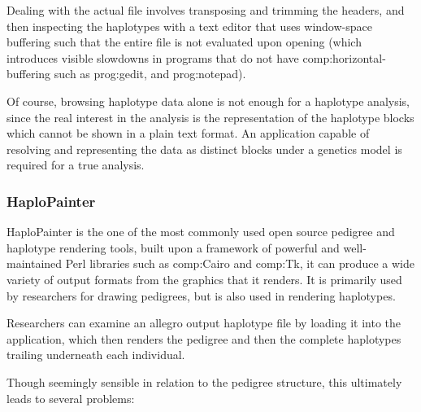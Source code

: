 Dealing with the actual file involves transposing and trimming the headers, and then inspecting the haplotypes with a text editor that uses window-space buffering such that the entire file is not evaluated upon opening (which introduces visible slowdowns in programs that do not have \gls{comp:horizontal-buffering} such as \gls{prog:gedit}, and \gls{prog:notepad}).

Of course, browsing haplotype data alone is not enough for a haplotype analysis, since the real interest in the analysis is the representation of the haplotype blocks which cannot be shown in a plain text format. An application capable of resolving and representing the data as distinct blocks under a genetics model is required for a true analysis.


\subsubsection{HaploPainter}

HaploPainter is the one of the most commonly used open source pedigree and haplotype rendering tools, built upon a framework of powerful and well-maintained Perl libraries such as \gls{comp:Cairo} and \gls{comp:Tk}, it can produce a wide variety of output formats from the graphics that it renders\citep{haplopainter}. It is primarily used by researchers for drawing pedigrees, but is also used in rendering haplotypes.

Researchers can examine an allegro output haplotype file by loading it into the application, which then renders the pedigree and then the complete haplotypes trailing underneath each individual.

Though seemingly sensible in relation to the pedigree structure, this ultimately leads to several problems:


